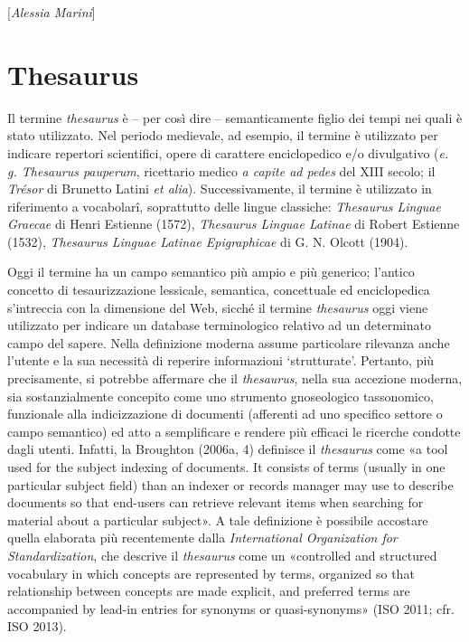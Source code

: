 \hrulefill 
 
{[}\emph{Alessia Marini}{]}

\chapter{Thesaurus}

Il termine \emph{thesaurus} è -- per così dire -- semanticamente figlio
dei tempi nei quali è stato utilizzato. Nel periodo medievale, ad
esempio, il termine è utilizzato per indicare repertori scientifici,
opere di carattere enciclopedico e/o divulgativo (\emph{e. g. Thesaurus
pauperum}, ricettario medico \emph{a capite ad pedes} del XIII secolo;
il \emph{Trésor} di Brunetto Latini \emph{et alia}). Successivamente, il
termine è utilizzato in riferimento a vocabolarî, soprattutto delle
lingue classiche: \emph{Thesaurus Linguae Graecae} di Henri Estienne
(1572), \emph{Thesaurus Linguae Latinae} di Robert Estienne (1532),
\emph{Thesaurus Linguae Latinae Epigraphicae} di G. N. Olcott (1904).

Oggi il termine ha un campo semantico più ampio e più generico; l'antico
concetto di tesaurizzazione lessicale, semantica, concettuale ed
enciclopedica s'intreccia con la dimensione del Web, sicché il termine
\emph{thesaurus} oggi viene utilizzato per indicare un database
terminologico relativo ad un determinato campo del sapere. Nella
definizione moderna assume particolare rilevanza anche l'utente e la sua
necessità di reperire informazioni `strutturate'. Pertanto, più
precisamente, si potrebbe affermare che il \emph{thesaurus}, nella sua
accezione moderna, sia sostanzialmente concepito come uno strumento
gnoseologico tassonomico, funzionale alla indicizzazione di documenti
(afferenti ad uno specifico settore o campo semantico) ed atto a
semplificare e rendere più efficaci le ricerche condotte dagli utenti.
Infatti, la Broughton (2006a, 4) definisce il \emph{thesaurus} come «a
tool used for the subject indexing of documents. It consists of terms
(usually in one particular subject field) than an indexer or records
manager may use to describe documents so that end-users can retrieve
relevant items when searching for material about a particular subject».
A tale definizione è possibile accostare quella elaborata più
recentemente dalla \emph{International Organization for
Standardization}, che descrive il \emph{thesaurus} come un «controlled
and structured vocabulary in which concepts are represented by terms,
organized so that relationship between concepts are made explicit, and
preferred terms are accompanied by lead-in entries for synonyms or
quasi-synonyms» (ISO 2011; cfr. ISO 2013).

